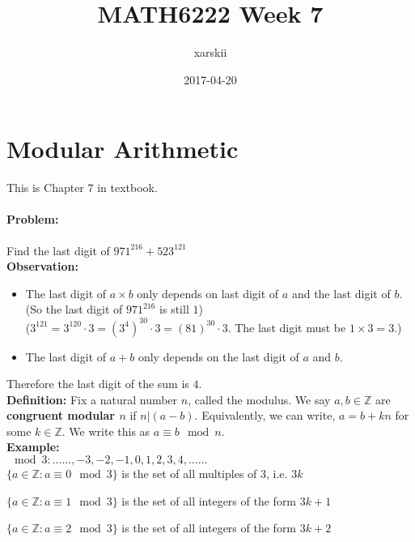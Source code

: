 \documentclass[a4paper, 11pt, twoside]{article}
\begin{document}
\title{MATH6222 Week 7}
\author{xarskii}
\date{2017-04-20}

\maketitle

\section{Modular Arithmetic}

This is Chapter 7 in textbook.

\paragraph{Problem:} Find the last digit of $971^{216}+523^{121}$\\

\textbf{Observation:}

\begin{itemize}
	\item The last digit of $a\times b$ only depends on last digit of $a$ and the last digit of $b$.\\
	(So the last digit of $971^{216}$ is still $1$)\\
	($3^{121}=3^{120}\cdot 3=(3^4)^{30}\cdot 3=(81)^{30}\cdot 3$. The last digit must be $1\times 3= 3$.)
	\item The last digit of $a+b$ only depends on the last digit of $a$ and $b$.
\end{itemize}

Therefore the last digit of the sum is $4$.\\

\textbf{Definition:} Fix a natural number $n$, called the modulus. We say $a,b\in\mathbb{Z}$ are \textbf{congruent modular $n$} if $n|(a-b)$. Equivalently, we can write, $a=b+kn$ for some $k\in\mathbb{Z}$. We write this as $a\equiv b\mod n.$\\

\textbf{Example:}\\

$\mod 3: \dots\dots, -3, -2, -1, 0, 1, 2, 3, 4, \dots\dots$\\

$\{a\in\mathbb{Z}: a\equiv 0 \mod 3\}$ is the set of all multiples of $3$, i.e. $3k$

$\{a\in\mathbb{Z}: a\equiv 1 \mod 3\}$ is the set of all integers of the form $3k+1$

$\{a\in\mathbb{Z}: a\equiv 2 \mod 3\}$ is the set of all integers of the form $3k+2$\\
\end{document}
